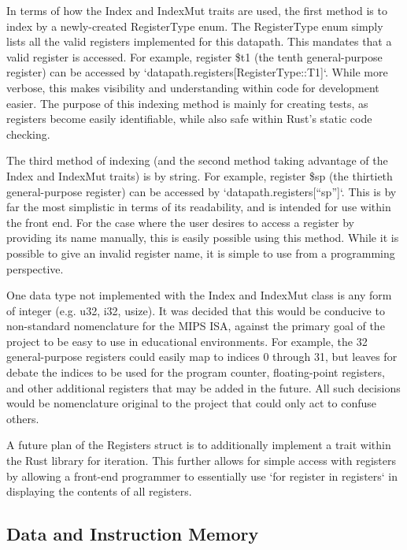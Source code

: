 \documentclass[
    paper=letter,
    parskip=half,
    fontsize=12pt,
    titlepage=firstiscover,
    toc=bibliography,
    numbers=endperiod
]{scrartcl}
\begin{document}
In terms of how the Index and IndexMut traits are used, the first method
is to index by a newly-created RegisterType enum. The RegisterType enum
simply lists all the valid registers implemented for this datapath. This
mandates that a valid register is accessed. For example, register \$t1
(the tenth general-purpose register) can be accessed by
`datapath.registers{[}RegisterType::T1{]}`. While more verbose, this
makes visibility and understanding within code for development easier.
The purpose of this indexing method is mainly for creating tests, as
registers become easily identifiable, while also safe within Rust's
static code checking.

The third method of indexing (and the second method taking advantage of
the Index and IndexMut traits) is by string. For example, register \$sp
(the thirtieth general-purpose register) can be accessed by
`datapath.registers{[}``sp''{]}`. This is by far the most simplistic in
terms of its readability, and is intended for use within the front end.
For the case where the user desires to access a register by providing
its name manually, this is easily possible using this method. While it
is possible to give an invalid register name, it is simple to use from a
programming perspective.

One data type not implemented with the Index and IndexMut class is any
form of integer (e.g. u32, i32, usize). It was decided that this would
be conducive to non-standard nomenclature for the MIPS ISA, against the
primary goal of the project to be easy to use in educational
environments. For example, the 32 general-purpose registers could easily
map to indices 0 through 31, but leaves for debate the indices to be
used for the program counter, floating-point registers, and other
additional registers that may be added in the future. All such decisions
would be nomenclature original to the project that could only act to
confuse others.


A future plan of the Registers struct is to additionally implement a
trait within the Rust library for iteration. This further allows for
simple access with registers by allowing a front-end programmer to
essentially use `for register in registers` in displaying the contents
of all registers.

\subsection{Data and Instruction Memory}
\end{document}
